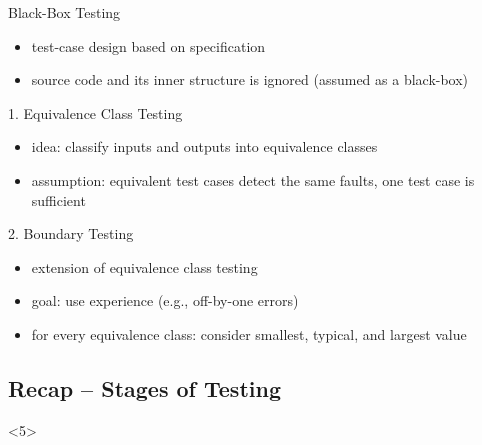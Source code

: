\begin{frame}
\begin{fancycolumns}[animation=none]
	\nextcolumn
	\pause
		\begin{definition}{Black-Box Testing } %
			\begin{itemize}
				\item test-case design based on specification
				\item source code and its inner structure is ignored (assumed as a black-box)
			\end{itemize}
		\end{definition}
		\begin{definition}{1. Equivalence Class Testing}
			\begin{itemize}
				\item idea: classify inputs and outputs into equivalence classes
				\item assumption: equivalent test cases detect the same faults, one test case is sufficient
			\end{itemize}
		\end{definition}
		\begin{definition}{2. Boundary Testing}
			\begin{itemize}
				\item extension of equivalence class testing
				\item goal: use experience (e.g., off-by-one errors)
				\item for every equivalence class: consider smallest, typical, and largest value
			\end{itemize}
		\end{definition}
	
	\end{fancycolumns}
\end{frame}

\subsection{Recap -- Stages of Testing}
\begin{frame}<5>{\insertsubsection}
	\slideStagesTesting
\end{frame}